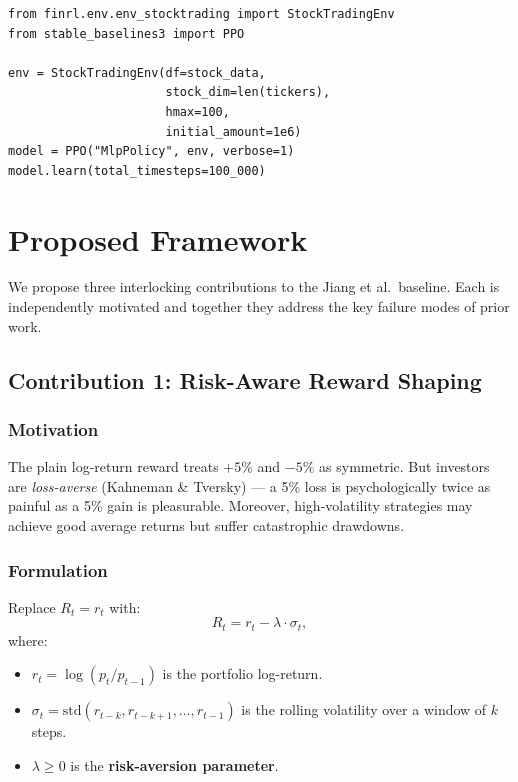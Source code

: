 \documentclass[12pt,a4paper]{article}
\begin{document}
\begin{lstlisting}[caption={FinRL environment usage sketch},label={lst:finrl}]
from finrl.env.env_stocktrading import StockTradingEnv
from stable_baselines3 import PPO

env = StockTradingEnv(df=stock_data,
                      stock_dim=len(tickers),
                      hmax=100,
                      initial_amount=1e6)
model = PPO("MlpPolicy", env, verbose=1)
model.learn(total_timesteps=100_000)
\end{lstlisting}

\section{Proposed Framework}

\begin{contribbox}
We propose three interlocking contributions to the Jiang et al.\ baseline.
Each is independently motivated and together they address the key failure
modes of prior work.
\end{contribbox}

\subsection{Contribution 1: Risk-Aware Reward Shaping}

\subsubsection*{Motivation}

The plain log-return reward treats $+5\%$ and $-5\%$ as symmetric.  But
investors are \emph{loss-averse} (Kahneman \& Tversky) --- a 5\% loss is
psychologically twice as painful as a 5\% gain is pleasurable.
Moreover, high-volatility strategies may achieve good average returns but
suffer catastrophic drawdowns.

\subsubsection*{Formulation}

Replace $R_t = r_t$ with:
\begin{equation}
  \boxed{R_t = r_t - \lambda \cdot \sigma_t,}
  \label{eq:riskaward}
\end{equation}
where:
\begin{itemize}[nosep]
  \item $r_t = \log(p_t / p_{t-1})$ is the portfolio log-return.
  \item $\sigma_t = \text{std}(r_{t-k}, r_{t-k+1}, \ldots, r_{t-1})$
        is the rolling volatility over a window of $k$ steps.
  \item $\lambda \ge 0$ is the \textbf{risk-aversion parameter}.
\end{itemize}
\end{document}
